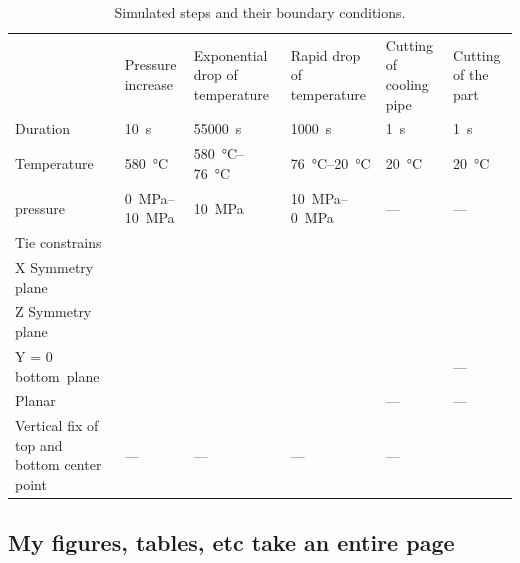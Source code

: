 \begin{table}
	\begin{fullpage} %
		\centering
		\footnotesize
		\begin{tabularx}{\linewidth}{>{\raggedright\arraybackslash}X >{\centering\arraybackslash}X >{\centering\arraybackslash}X >{\centering\arraybackslash}X >{\centering\arraybackslash}X >{\centering\arraybackslash}X}
			\toprule
			& Pressure increase & Exponential drop of temperature & Rapid drop of temperature & Cutting of cooling pipe & Cutting of the part \\
			\cmidrule(r){2-4} \cmidrule(l){5-6}
			Duration & \qty{10}{\second} & \qty{55000}{\second} & \qty{1000}{\second} & \qty{1}{\second} & \qty{1}{\second} \\
			\midrule
			Temperature  & \qty{580}{\celsius} & \qtyrange[range-units=single]{580}{76}{\celsius} & \qtyrange[range-units=single]{76}{20}{\celsius} & \qty{20}{\celsius} & \qty{20}{\celsius} \\
			\midrule
			\glsxtrshort{HRP} pressure & \qtyrange[range-units=single]{0}{10}{\mega\pascal} & \qty{10}{\mega\pascal} & \qtyrange[range-units=single]{10}{0}{\mega\pascal} & --- & --- \\
			\midrule
			Tie constrains & \checkmark & \checkmark & \checkmark & \checkmark &  \checkmark \\
			\midrule
			X Symmetry plane & \checkmark & \checkmark & \checkmark & \checkmark &  \checkmark \\
			Z Symmetry plane & \checkmark & \checkmark & \checkmark & \checkmark &  \checkmark \\
			Y = 0 \mbox{bottom plane} & \checkmark & \checkmark & \checkmark & \checkmark & ---  \\
			\midrule
			Planar \glsxtrshort{BC} & \checkmark & \checkmark & \checkmark & ---  & --- \\
			\midrule
			Vertical fix of top and bottom center point & --- & --- & --- & --- & \checkmark \\
			\bottomrule
		\end{tabularx}
		\caption{Simulated steps and their boundary conditions.}
		\label{tab:fem-steps}
	\end{fullpage}
\end{table}

\subsection{My figures, tables, etc take an entire page}

